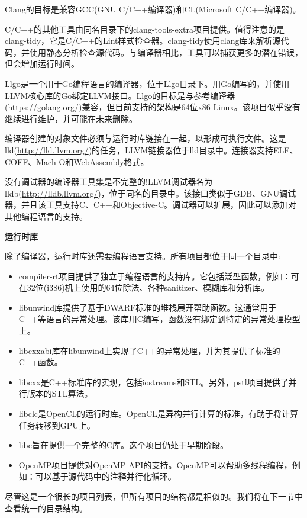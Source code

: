 Clang的目标是兼容GCC(GNU C/C++编译器)和CL(Microsoft C/C++编译器)。\par

C/C++的其他工具由同名目录下的clang-tools-extra项目提供。值得注意的是clang-tidy，它是C/C++的Lint样式检查器。clang-tidy使用clang库来解析源代码，并使用静态分析检查源代码。与编译器相比，工具可以捕获更多的潜在错误，但会增加运行时间。\par

Llgo是一个用于Go编程语言的编译器，位于Llgo目录下。用Go编写的，并使用LLVM核心库的Go绑定LLVM接口。Llgo的目标是与参考编译器(\url{https://golang.org/})兼容，但目前支持的架构是64位x86 Linux。该项目似乎没有继续进行维护，并可能在未来删除。\par

编译器创建的对象文件必须与运行时库链接在一起，以形成可执行文件。这是lld(\url{http://lld.llvm.org/})的任务，LLVM链接器位于lld目录中。连接器支持ELF、COFF、Mach-O和WebAssembly格式。\par

没有调试器的编译器工具集是不完整的!LLVM调试器名为lldb(\url{http://lldb.llvm.org/})，位于同名的目录中。该接口类似于GDB、GNU调试器，并且该工具支持C、C++和Objective-C。调试器可以扩展，因此可以添加对其他编程语言的支持。\par

\hspace*{\fill} \par %
\textbf{运行时库}

除了编译器，运行时库还需要编程语言支持。所有项目都位于同一个目录中:\par

\begin{itemize}
\item compiler-rt项目提供了独立于编程语言的支持库。它包括泛型函数，例如：可在32位(i386)机上使用的64位除法、各种sanitizer、模糊库和分析库。

\item libunwind库提供了基于DWARF标准的堆栈展开帮助函数。这通常用于C++等语言的异常处理。该库用C编写，函数没有绑定到特定的异常处理模型上。

\item libcxxabi库在libunwind上实现了C++的异常处理，并为其提供了标准的C++函数。

\item libcxx是C++标准库的实现，包括iostreams和STL。另外，pstl项目提供了并行版本的STL算法。

\item libclc是OpenCL的运行时库。OpenCL是异构并行计算的标准，有助于将计算任务转移到GPU上。

\item libc旨在提供一个完整的C库。这个项目仍处于早期阶段。

\item OpenMP项目提供对OpenMP API的支持。OpenMP可以帮助多线程编程，例如：可以基于源代码中的注释并行化循环。
\end{itemize}

尽管这是一个很长的项目列表，但所有项目的结构都是相似的。我们将在下一节中查看统一的目录结构。\par








